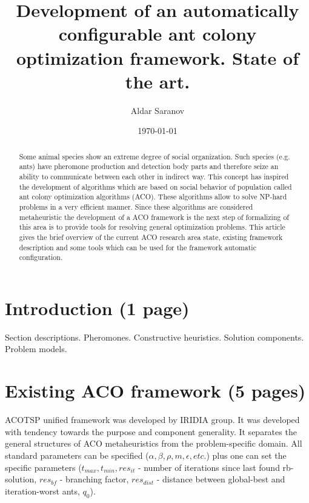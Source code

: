 \documentclass[12pt]{article}
\author{Aldar Saranov}
\date{\today}
\title{Development of an automatically configurable ant colony optimization framework. State of the art.}
\begin{document}
\maketitle 
\newpage

\tableofcontents
\newpage

\begin{abstract}
Some animal species show an extreme degree of social organization. Such species (e.g. ants) have pheromone production and detection body parts and therefore seize an ability to communicate between each other in indirect way. This concept has inspired the development of algorithms which are based on social behavior of population called ant colony optimization algorithms (ACO). These algorithms allow to solve NP-hard problems in a very efficient manner. Since these algorithms are considered metaheuristic the development of a ACO framework is the next step of formalizing of this area is to provide tools for resolving general optimization problems. This article gives the brief overview of the current ACO research area state, existing framework description and some tools which can be used for the framework automatic configuration.
\end{abstract}



\section{Introduction (1 page)}
Section descriptions.
Pheromones.
Constructive heuristics.
Solution components.
Problem models.








\section{Existing ACO framework (5 pages)}

ACOTSP unified framework was developed by IRIDIA group. It was developed with tendency towards the purpose and component generality. It separates the general structures of ACO metaheuristics from the problem-specific domain. All standard parameters can be specified ($\alpha, \beta, \rho, m, \epsilon, etc.$) plus one can set the specific parameters ($t_{max}, t_{min}, res_{it}$ - number of iterations since last found rb-solution, $res_{bf}$ - branching factor, $res_{dist}$ - distance between global-best and iteration-worst ants, $q_0$).
\end{document}
